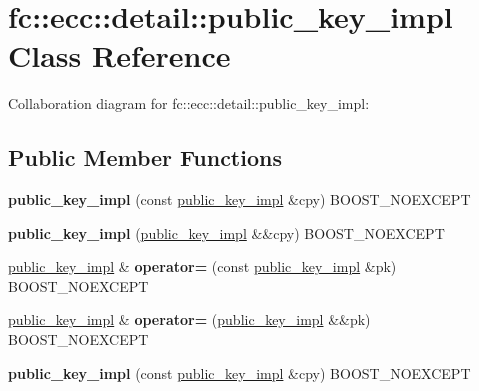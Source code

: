 \hypertarget{classfc_1_1ecc_1_1detail_1_1public__key__impl}{}\section{fc\+:\+:ecc\+:\+:detail\+:\+:public\+\_\+key\+\_\+impl Class Reference}
\label{classfc_1_1ecc_1_1detail_1_1public__key__impl}


Collaboration diagram for fc\+:\+:ecc\+:\+:detail\+:\+:public\+\_\+key\+\_\+impl\+:
\subsection*{Public Member Functions}
\begin{DoxyCompactItemize}
\item 
\mbox{\label{classfc_1_1ecc_1_1detail_1_1public__key__impl_ae106b784d9cad9cb02c02c86e47e8cad}} 
{\bfseries public\+\_\+key\+\_\+impl} (const \mbox{\hyperlink{classfc_1_1ecc_1_1detail_1_1public__key__impl}{public\+\_\+key\+\_\+impl}} \&cpy) B\+O\+O\+S\+T\+\_\+\+N\+O\+E\+X\+C\+E\+PT
\item 
\mbox{\label{classfc_1_1ecc_1_1detail_1_1public__key__impl_a207584088a1daf4532bef012d728a012}} 
{\bfseries public\+\_\+key\+\_\+impl} (\mbox{\hyperlink{classfc_1_1ecc_1_1detail_1_1public__key__impl}{public\+\_\+key\+\_\+impl}} \&\&cpy) B\+O\+O\+S\+T\+\_\+\+N\+O\+E\+X\+C\+E\+PT
\item 
\mbox{\label{classfc_1_1ecc_1_1detail_1_1public__key__impl_a54a6a831308d677ff27cbec294832ef3}} 
\mbox{\hyperlink{classfc_1_1ecc_1_1detail_1_1public__key__impl}{public\+\_\+key\+\_\+impl}} \& {\bfseries operator=} (const \mbox{\hyperlink{classfc_1_1ecc_1_1detail_1_1public__key__impl}{public\+\_\+key\+\_\+impl}} \&pk) B\+O\+O\+S\+T\+\_\+\+N\+O\+E\+X\+C\+E\+PT
\item 
\mbox{\label{classfc_1_1ecc_1_1detail_1_1public__key__impl_a40428fda295487d8d76b92bc65acadda}} 
\mbox{\hyperlink{classfc_1_1ecc_1_1detail_1_1public__key__impl}{public\+\_\+key\+\_\+impl}} \& {\bfseries operator=} (\mbox{\hyperlink{classfc_1_1ecc_1_1detail_1_1public__key__impl}{public\+\_\+key\+\_\+impl}} \&\&pk) B\+O\+O\+S\+T\+\_\+\+N\+O\+E\+X\+C\+E\+PT
\item 
\mbox{\label{classfc_1_1ecc_1_1detail_1_1public__key__impl_ae106b784d9cad9cb02c02c86e47e8cad}} 
{\bfseries public\+\_\+key\+\_\+impl} (const \mbox{\hyperlink{classfc_1_1ecc_1_1detail_1_1public__key__impl}{public\+\_\+key\+\_\+impl}} \&cpy) B\+O\+O\+S\+T\+\_\+\+N\+O\+E\+X\+C\+E\+PT
\end{DoxyCompactItemize}
